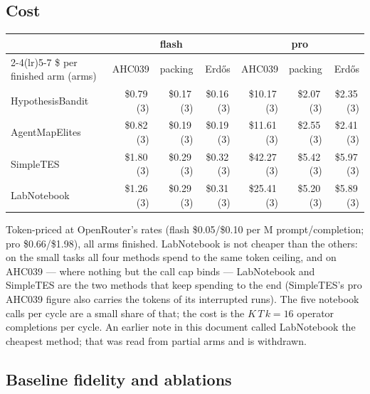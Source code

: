 \subsection{Cost}

\begin{center}\small
\begin{tabular}{@{}lrrrrrr@{}}
\toprule
& \multicolumn{3}{c}{flash} & \multicolumn{3}{c}{pro} \\
\cmidrule(lr){2-4}\cmidrule(lr){5-7}
\$ per finished arm (arms) & AHC039 & packing & Erd\H{o}s & AHC039 & packing & Erd\H{o}s \\
\midrule
HypothesisBandit & \$0.79{\scriptsize\,(3)} & \$0.17{\scriptsize\,(3)} & \$0.16{\scriptsize\,(3)} & \$10.17{\scriptsize\,(3)} & \$2.07{\scriptsize\,(3)} & \$2.35{\scriptsize\,(3)} \\
AgentMapElites & \$0.82{\scriptsize\,(3)} & \$0.19{\scriptsize\,(3)} & \$0.19{\scriptsize\,(3)} & \$11.61{\scriptsize\,(3)} & \$2.55{\scriptsize\,(3)} & \$2.41{\scriptsize\,(3)} \\
SimpleTES & \$1.80{\scriptsize\,(3)} & \$0.29{\scriptsize\,(3)} & \$0.32{\scriptsize\,(3)} & \$42.27{\scriptsize\,(3)} & \$5.42{\scriptsize\,(3)} & \$5.97{\scriptsize\,(3)} \\
LabNotebook & \$1.26{\scriptsize\,(3)} & \$0.29{\scriptsize\,(3)} & \$0.31{\scriptsize\,(3)} & \$25.41{\scriptsize\,(3)} & \$5.20{\scriptsize\,(3)} & \$5.89{\scriptsize\,(3)} \\
\bottomrule
\end{tabular}
\end{center}

\noindent Token-priced at OpenRouter's rates (flash \$0.05/\$0.10 per M prompt/completion; pro
\$0.66/\$1.98), all arms finished. LabNotebook is not cheaper than the others: on the small tasks all four methods
spend to the same token ceiling, and on AHC039 --- where nothing but the call cap binds ---
LabNotebook and SimpleTES are the two methods that keep spending to the end (SimpleTES's pro AHC039
figure also carries the tokens of its interrupted runs). The five notebook calls per cycle are a small share of
that; the cost is the $K\,T\,k=16$ operator completions per cycle. An earlier note in this document
called LabNotebook the cheapest method; that was read from partial arms and is withdrawn.

\subsection{Baseline fidelity and ablations}
\label{sec:parts}

